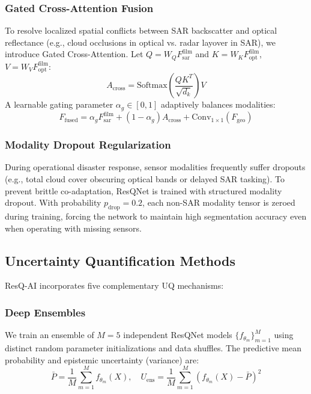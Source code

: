 \documentclass[journal]{IEEEtran}
\begin{document}
\subsubsection{Gated Cross-Attention Fusion}
To resolve localized spatial conflicts between SAR backscatter and optical reflectance (e.g., cloud occlusions in optical vs. radar layover in SAR), we introduce Gated Cross-Attention. Let $Q = W_Q F_{\text{sar}}^{\text{film}}$ and $K = W_K F_{\text{opt}}^{\text{film}}$, $V = W_V F_{\text{opt}}^{\text{film}}$:
\begin{equation}
A_{\text{cross}} = \text{Softmax}\left(\frac{Q K^T}{\sqrt{d_k}}\right) V
\end{equation}
A learnable gating parameter $\alpha_g \in [0, 1]$ adaptively balances modalities:
\begin{equation}
F_{\text{fused}} = \alpha_g F_{\text{sar}}^{\text{film}} + (1 - \alpha_g) A_{\text{cross}} + \text{Conv}_{1\times 1}(F_{\text{geo}})
\end{equation}

\subsubsection{Modality Dropout Regularization}
During operational disaster response, sensor modalities frequently suffer dropouts (e.g., total cloud cover obscuring optical bands or delayed SAR tasking). To prevent brittle co-adaptation, ResQNet is trained with structured modality dropout. With probability $p_{\text{drop}} = 0.2$, each non-SAR modality tensor is zeroed during training, forcing the network to maintain high segmentation accuracy even when operating with missing sensors.

\subsection{Uncertainty Quantification Methods}
ResQ-AI incorporates five complementary UQ mechanisms:

\subsubsection{Deep Ensembles}
We train an ensemble of $M = 5$ independent ResQNet models $\{f_{\theta_m}\}_{m=1}^M$ using distinct random parameter initializations and data shuffles. The predictive mean probability and epistemic uncertainty (variance) are:
\begin{equation}
\bar{P} = \frac{1}{M} \sum_{m=1}^M f_{\theta_m}(X), \quad U_{\text{ens}} = \frac{1}{M} \sum_{m=1}^M (f_{\theta_m}(X) - \bar{P})^2
\end{equation}
\end{document}
